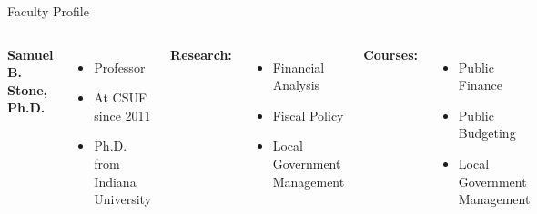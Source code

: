 \documentclass[10pt]{beamer}
\newlength{\imageheight}
\begin{document}
        \begin{frame}{Faculty Profile}
        \begin{columns}[T]
        \textbf{Samuel B. Stone, Ph.D.}
        \begin{itemize}
        \item Professor
        \item At CSUF since 2011
        \item Ph.D. from Indiana University
        \end{itemize}
        
        \textbf{Research:}
        \begin{itemize}
        \item Financial Analysis
        \item Fiscal Policy
        \item Local Government Management
        \end{itemize}
        
        \textbf{Courses:}
        \begin{itemize}
        \item Public Finance
        \item Public Budgeting
        \item Local Government Management
        \end{itemize}

        \vspace*{0.5cm}
        \includegraphics[height=\imageheight]{images/stone.jpg}
        \end{columns}
        \end{frame}
\end{document}
